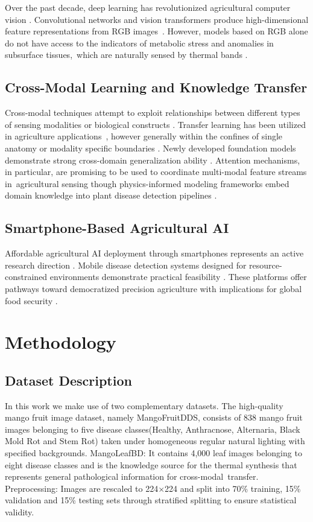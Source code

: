 \documentclass[conference]{IEEEtran}
\begin{document}
Over the past decade, deep learning has revolutionized agricultural computer vision \cite{kamilaris2018}. Convolutional networks and vision transformers produce high-dimensional feature representations from RGB images \cite{dosovitskiy2021}. However, models based on RGB alone do not have access to the indicators of metabolic stress and anomalies in subsurface tissues, which are naturally sensed by thermal bands \cite{lu2020}. 
\subsection{Cross-Modal Learning and Knowledge Transfer}

Cross-modal techniques attempt to exploit relationships between different types of sensing modalities or biological constructs \cite{zhuang2020}. Transfer learning has been utilized in agriculture applications \cite{chen2020_transfer,tan2018}, however generally within the confines of single anatomy or modality specific boundaries \cite{barbedo2019}.
Newly developed foundation models demonstrate strong cross-domain generalization ability \cite{vaswani2017}. Attention mechanisms, in particular, are promising to be used to coordinate multi-modal feature streams in agricultural sensing \cite{niu2021} though physics-informed modeling frameworks embed domain knowledge into plant disease detection pipelines \cite{karniadakis2021}. 

\subsection{Smartphone-Based Agricultural AI}

Affordable agricultural AI deployment through smartphones represents an active research direction \cite{pongnumkul2015}. Mobile disease detection systems designed for resource-constrained environments demonstrate practical feasibility \cite{li2020}. These platforms offer pathways toward democratized precision agriculture with implications for global food security \cite{liu2020_yolo}.

\section{Methodology}

\subsection{Dataset Description}
In this work we make use of two complementary datasets. The high-quality mango fruit image dataset, namely MangoFruitDDS, consists of 838 mango fruit images belonging to five disease classes(Healthy, Anthracnose, Alternaria, Black Mold Rot and Stem Rot) taken under homogeneous regular natural lighting with speciﬁed backgrounds. MangoLeafBD: It contains 4,000 leaf images belonging to eight disease classes and is the knowledge source for the thermal synthesis that represents general pathological information for cross-modal transfer.
Preprocessing: Images are rescaled to 224×224 and split into 70\% training, 15\% validation and 15\% testing sets through stratified splitting to ensure statistical validity. 
\end{document}

